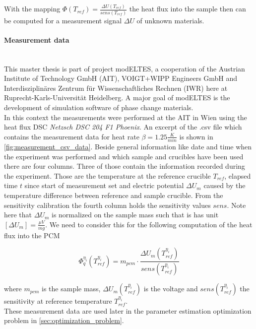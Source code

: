 \documentclass{scrartcl}[12pt, halfparskip]
\numberwithin{equation}{section}
\numberwithin{figure}{section}
\numberwithin{table}{section}
\begin{document}
With the mapping $\varPhi(T_{ref}) = \frac{\Delta U(T_{ref})}{sens(T_{ref})}$ the heat flux into the sample then can be computed for a measurement signal $\Delta U$ of unknown materials. 

\paragraph{Measurement data}\mbox{}\\
This master thesis is part of project modELTES, a cooperation of the Austrian Institute of Technology GmbH (AIT), VOIGT+WIPP Engineers GmbH and Interdisziplinäres Zentrum für Wissenschaftliches Rechnen (IWR) here at Ruprecht-Karls-Universität Heidelberg. A major goal of modELTES is the development of simulation software of phase change materials. \\
In this context the measurements were performed at the AIT in Wien using the heat flux DSC \textit{Netzsch DSC 204 F1 Phoenix\textsuperscript{\textregistered}}. An excerpt of the .csv file which contains the measurement data for heat rate ${\beta=1.25 \frac{K}{min}}$ is shown in \cref{fig:measurement_csv_data}. Beside general information like date and time when the experiment was performed and which sample and crucibles have been used there are four columns. Three of those contain the information recorded during the experiment. Those are the temperature at the reference crucible $T_{ref}$, elapsed time $t$ since start of measurement set and electric potential $\Delta U_m$ caused by the temperature difference between reference and sample crucible. 
From the sensitivity calibration the fourth column holds the sensitivity values $sens$.
Note here that $\Delta U_m$ is normalized on the sample mass such that is has unit $[\Delta U_m]=\frac{\mu V}{mg}$. We need to consider this for the following computation of the heat flux into the PCM

\begin{equation}
	\varPhi_q^{\eta_i}(T_{ref}^{\eta_i}) = m_{pcm} \cdot \frac{\Delta U_m(T_{ref}^{\eta_i})}{sens(T_{ref}^{\eta_i})}
\end{equation}

where $m_{pcm}$ is the sample mass, $\Delta U_m(T_{ref}^{\eta_i})$ is the voltage and $sens(T_{ref}^{\eta_i})$ the sensitivity at reference temperature $T_{ref}^{\eta_i}$. \\
These measurement data are used later in the parameter estimation optimization problem in \cref{sec:optimization_problem}.
\end{document}
